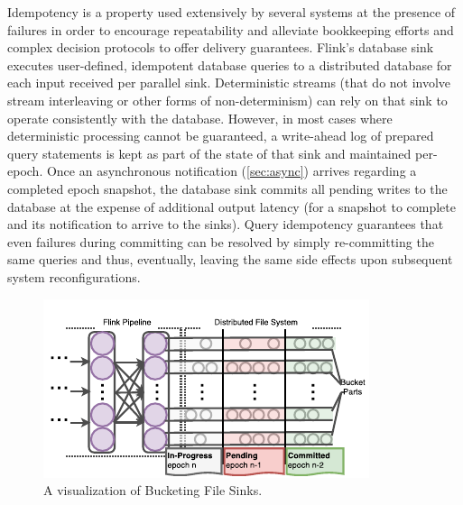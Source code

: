  Idempotency is a property used extensively by several systems at the presence of failures in order to encourage repeatability and alleviate bookkeeping efforts and complex decision protocols to offer delivery guarantees\cite{CUSTOM:web/SparkStructuredStreaming,millwheel}. Flink's database sink executes user-defined, idempotent database queries to a distributed database for each input received per parallel sink. Deterministic streams (that do not involve stream interleaving or other forms of non-determinism) can rely on that sink to operate consistently with the database. However, in most cases where deterministic processing cannot be guaranteed, a write-ahead log of prepared query statements is kept as part of the state of that sink and maintained per-epoch. Once an asynchronous notification (\autoref{sec:async}) arrives regarding a completed epoch snapshot, the database sink commits all pending writes to the database at the expense of additional output latency (for a snapshot to complete and its notification to arrive to the sinks). Query idempotency guarantees that even failures during committing can be resolved by simply re-committing the same queries and thus, eventually, leaving the same side effects upon subsequent system reconfigurations. 

\begin{figure}[t!]
\centering
\includegraphics[width=\textwidth / 2]{figures/filecommit.pdf}
\caption{A visualization of Bucketing File Sinks.} 
\label{fig:filecommit}
\vspace{-4mm}
\end{figure}

